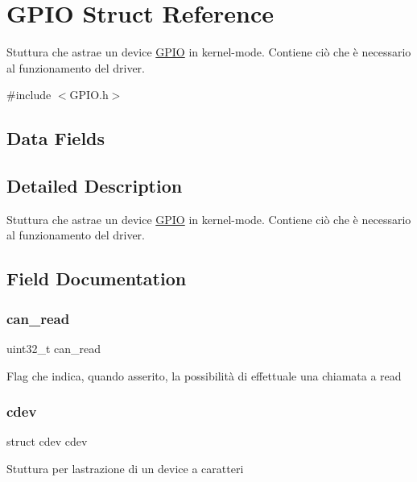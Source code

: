 \hypertarget{structGPIO}{}\section{G\+P\+IO Struct Reference}
\label{structGPIO}


Stuttura che astrae un device \hyperlink{structGPIO}{G\+P\+IO} in kernel-\/mode. Contiene ciò che è necessario al funzionamento del driver.  




{\ttfamily \#include $<$G\+P\+I\+O.\+h$>$}

\subsection*{Data Fields}


\subsection{Detailed Description}
Stuttura che astrae un device \hyperlink{structGPIO}{G\+P\+IO} in kernel-\/mode. Contiene ciò che è necessario al funzionamento del driver. 

\subsection{Field Documentation}
\mbox{\label{structGPIO_a2b8d3d6037e2d2fdadbd7c2fd995f0a1}} 
\subsubsection{\texorpdfstring{can\+\_\+read}{can\_read}}
{\footnotesize\ttfamily uint32\+\_\+t can\+\_\+read}

Flag che indica, quando asserito, la possibilità di effettuale una chiamata a read \mbox{\label{structGPIO_acba682fe45d5a1501790dbdb1d99bd6a}} 
\subsubsection{\texorpdfstring{cdev}{cdev}}
{\footnotesize\ttfamily struct cdev cdev}

Stuttura per l\textquotesingle{}astrazione di un device a caratteri \mbox{\label{structGPIO_a9b6474dd18270738a5c4853fd93b5e70}} 
